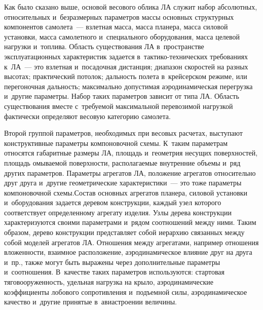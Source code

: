 \begin{multicols}{2}
  Как было сказано выше, основой весового облика ЛА служит набор 
абсолютных, относительных и~безразмерных параметров массы основных 
структурных компонентов самолета~--- взлетная масса, масса планера, масса 
силовой установки, масса самолетного и~специального оборудования, масса 
целевой нагрузки и~топлива. Область существования ЛА в~пространстве 
эксплуатационных характеристик задается в~так\-ти\-ко-тех\-ни\-че\-ских 
требованиях к~ЛА~--- это взлетная и~посадочная дистанция; диапазон 
скоростей на разных высотах; практический потолок; дальность полета 
в~крейсерском режиме, или перегоночная дальность; максимально до\-пус\-ти\-мая 
аэродинамическая перегрузка и~другие параметры. Набор таких параметров 
зависит от типа ЛА. Об\-ласть существования вместе с~требуемой максимальной 
перевозимой нагрузкой фактически определяют весовую категорию самолета. 
  
  Второй группой параметров, необходимых при весовых расчетах, выступают 
конструктивные параметры компоновочной схемы. К~таким параметрам 
относятся габаритные размеры ЛА, площадь и~геометрия несущих 
поверхностей, площадь омываемой поверхности, располагаемые внутренние 
объемы и~ряд других параметров. Параметры агрегатов ЛА, положение 
агрегатов относительно друг друга и~другие геометрические характеристики~--- 
это тоже параметры компоновочной схемы.\linebreak Состав основных агрегатов 
планера, силовой установки и~оборудования задается деревом конструкции, 
каж\-дый узел которого соответствует определенному агрегату изделия. Узлы 
дерева \mbox{конструкции} характеризуются своими па\-ра\-мет\-ра\-ми и~рядом 
соотношений между ними. Таким образом, дерево кон\-ст\-рук\-ции пред\-став\-ля\-ет 
собой иерархию связанных между собой моделей агрегатов ЛА. Отношения 
между агрегатами, например отношения вло\-жен\-ности, взаимное расположение, 
аэродинамическое влияние друг на друга и~пр., также могут быть выражены 
через дополнительные па\-ра\-мет\-ры и~соотношения. В~качестве таких пара\-мет\-ров 
используются: стартовая тяговооруженность, удельная нагрузка на крыло, 
аэродинамические коэффициенты лобового сопротивления и~подъемной силы, 
аэродинамическое качество и~другие принятые в~авиастроении величины. 
  

\end{multicols}
